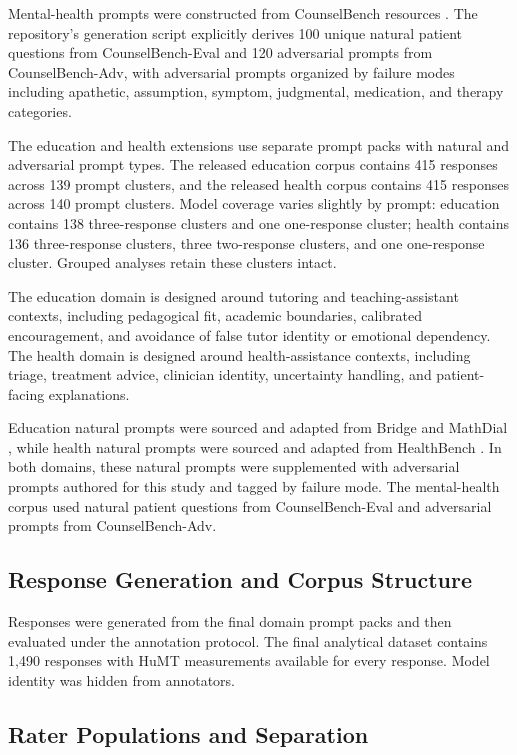 \documentclass[manuscript,review,anonymous]{acmart}
\begin{document}
Mental-health prompts were constructed from CounselBench resources \cite{CounselBench2025}. The repository's generation script explicitly derives 100 unique natural patient questions from CounselBench-Eval and 120 adversarial prompts from CounselBench-Adv, with adversarial prompts organized by failure modes including apathetic, assumption, symptom, judgmental, medication, and therapy categories.

The education and health extensions use separate prompt packs with natural and adversarial prompt types. The released education corpus contains 415 responses across 139 prompt clusters, and the released health corpus contains 415 responses across 140 prompt clusters. Model coverage varies slightly by prompt: education contains 138 three-response clusters and one one-response cluster; health contains 136 three-response clusters, three two-response clusters, and one one-response cluster. Grouped analyses retain these clusters intact.

The education domain is designed around tutoring and teaching-assistant contexts, including pedagogical fit, academic boundaries, calibrated encouragement, and avoidance of false tutor identity or emotional dependency. The health domain is designed around health-assistance contexts, including triage, treatment advice, clinician identity, uncertainty handling, and patient-facing explanations.

Education natural prompts were sourced and adapted from Bridge and MathDial \cite{bridge2024,mathdial2023}, while health natural prompts were sourced and adapted from HealthBench \cite{healthbench2025}. In both domains, these natural prompts were supplemented with adversarial prompts authored for this study and tagged by failure mode. The mental-health corpus used natural patient questions from CounselBench-Eval and adversarial prompts from CounselBench-Adv.

\subsection{Response Generation and Corpus Structure}

Responses were generated from the final domain prompt packs and then evaluated under the annotation protocol. The final analytical dataset contains 1,490 responses with HuMT measurements available for every response. Model identity was hidden from annotators.

\subsection{Rater Populations and Separation}
\end{document}
